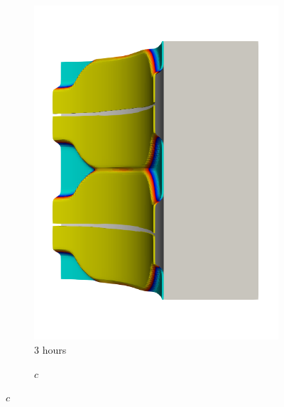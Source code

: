 \begin{figure}[!htb]
\begin{subfigure}[b]{0.2\textwidth}
    \includegraphics[width=\textwidth]{Chapter5/figures/spallation/seed_c_7}
    \caption{3 hours}
  \end{subfigure}
  \begin{subfigure}[b]{0.1\textwidth}
    \centering
    \caption*{$c$}

\end{subfigure}
\end{figure}
